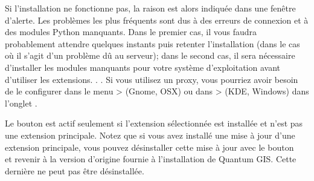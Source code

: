 Si l'installation ne fonctionne pas, la raison est alors indiquée dans une 
fenêtre d'alerte. Les problèmes les plus fréquents sont dus à des erreurs 
de connexion et à des modules Python manquants. Dans le premier cas, il 
vous faudra probablement attendre quelques instants puis retenter l'installation 
(dans le cas où il s'agit d'un problème dû au serveur); dans le second cas, 
il sera nécessaire d'installer les modules manquants pour votre système 
d'exploitation avant d'utiliser les extensions. . . Si vous utilisez un proxy, vous pourriez avoir 
besoin de le configurer dans le menu  > 
 (Gnome, OSX) ou dans  
>  (KDE, Windows) dans l'onglet .

Le bouton  est actif seulement si l'extension 
sélectionnée est installée et n'est pas une extension principale. Notez que si 
vous avez installé une mise à jour d'une extension principale, vous pouvez 
désinstaller cette mise à jour avec le bouton\\  
et revenir à la version d'origine fournie à l'installation de Quantum GIS. Cette 
dernière ne peut pas être désinstallée.


